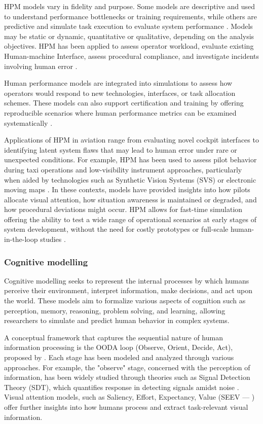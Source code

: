 \documentclass[12pt,a4paper]{article} %
\begin{document}
	HPM models vary in fidelity and purpose. Some models are descriptive and used to understand performance bottlenecks or training requirements, while others are predictive and simulate task execution to evaluate system performance \parencite{li_human_2020}. Models may be static or dynamic, quantitative or qualitative, depending on the analysis objectives. HPM has been applied to assess operator workload, evaluate existing Human-machine Interface, assess procedural compliance, and investigate incidents involving human error \parencite{zhang_pilot_2013,balaji_act-r_2023}.

	Human performance models are integrated into simulations to assess how operators would respond to new technologies, interfaces, or task allocation schemes. These models can also support certification and training by offering reproducible scenarios where human performance metrics can be examined systematically \parencite{wang_survey_2023,wu_pilot_2016}. 

	Applications of HPM in aviation range from evaluating novel cockpit interfaces to identifying latent system flaws that may lead to human error under rare or unexpected conditions. For example, HPM has been used to assess pilot behavior during taxi operations and low-visibility instrument approaches, particularly when aided by technologies such as Synthetic Vision Systems (SVS) or electronic moving maps \parencite{foyle_human_2005}. In these contexts, models have provided insights into how pilots allocate visual attention, how situation awareness is maintained or degraded, and how procedural deviations might occur. HPM allows for fast-time simulation offering the ability to test a wide range of operational scenarios at early stages of system development, without the need for costly prototypes or full-scale human-in-the-loop studies \parencite{andrews_reshaping_2020}.


	\subsubsection{Cognitive modelling}
	Cognitive modelling seeks to represent the internal processes by which humans perceive their environment, interpret information, make decisions, and act upon the world. These models aim to formalize various aspects of cognition such as perception, memory, reasoning, problem solving, and learning, allowing researchers to simulate and predict human behavior in complex systems.

	A conceptual framework that captures the sequential nature of human information processing is the OODA loop (Observe, Orient, Decide, Act), proposed by \textcite{boyd_essence_1995}. Each stage has been modeled and analyzed through various approaches. For example, the "observe" stage, concerned with the perception of information, has been widely studied through theories such as Signal Detection Theory (SDT), which quantifies response in detecting signals amidst noise \parencite{swets_signal_2001}. Visual attention models, such as Saliency, Effort, Expectancy, Value (SEEV --- \cite{wickens_attention_2021}) offer further insights into how humans process and extract task-relevant visual information.
\end{document}
